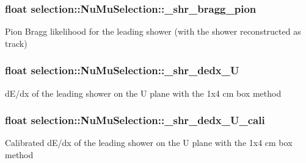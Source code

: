 \subsubsection[{\texorpdfstring{\+\_\+shr\+\_\+bragg\+\_\+pion}{_shr_bragg_pion}}]{\setlength{\rightskip}{0pt plus 5cm}float selection\+::\+Nu\+Mu\+Selection\+::\+\_\+shr\+\_\+bragg\+\_\+pion\hspace{0.3cm}{\ttfamily [private]}}\hypertarget{classselection_1_1NuMuSelection_a965ff03e4cd45fa4a7267f2c4576c99e}{}\label{classselection_1_1NuMuSelection_a965ff03e4cd45fa4a7267f2c4576c99e}
Pion Bragg likelihood for the leading shower (with the shower reconstructed as track) 
\subsubsection[{\texorpdfstring{\+\_\+shr\+\_\+dedx\+\_\+U}{_shr_dedx_U}}]{\setlength{\rightskip}{0pt plus 5cm}float selection\+::\+Nu\+Mu\+Selection\+::\+\_\+shr\+\_\+dedx\+\_\+U\hspace{0.3cm}{\ttfamily [private]}}\hypertarget{classselection_1_1NuMuSelection_a208bf1de9d20aa592d340dd331d6a524}{}\label{classselection_1_1NuMuSelection_a208bf1de9d20aa592d340dd331d6a524}
d\+E/dx of the leading shower on the U plane with the 1x4 cm box method 
\subsubsection[{\texorpdfstring{\+\_\+shr\+\_\+dedx\+\_\+\+U\+\_\+cali}{_shr_dedx_U_cali}}]{\setlength{\rightskip}{0pt plus 5cm}float selection\+::\+Nu\+Mu\+Selection\+::\+\_\+shr\+\_\+dedx\+\_\+\+U\+\_\+cali\hspace{0.3cm}{\ttfamily [private]}}\hypertarget{classselection_1_1NuMuSelection_a155e84bd4da519558ee39d6d9955e93b}{}\label{classselection_1_1NuMuSelection_a155e84bd4da519558ee39d6d9955e93b}
Calibrated d\+E/dx of the leading shower on the U plane with the 1x4 cm box method 
